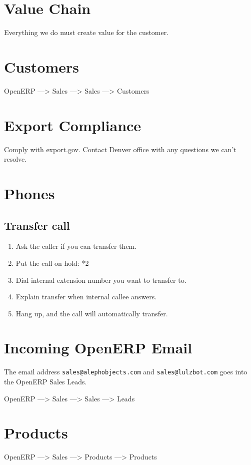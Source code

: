 \section{Value Chain}
Everything we do must create value for the customer.

\section{Customers}
OpenERP ---> Sales ---> Sales ---> Customers

\section{Export Compliance}
Comply with export.gov. Contact Denver office with any questions we can't
resolve.

\section{Phones}
\subsection{Transfer call}
\begin{enumerate}
\item Ask the caller if you can transfer them.
\item Put the call on hold: *2
\item Dial internal extension number you want to transfer to.
\item Explain transfer when internal callee answers.
\item Hang up, and the call will automatically transfer.
\end{enumerate}

\section{Incoming OpenERP Email}
The email address \texttt{sales@alephobjects.com} and
\texttt{sales@lulzbot.com} goes into the OpenERP Sales Leads.

OpenERP ---> Sales ---> Sales ---> Leads

\section{Products}

OpenERP ---> Sales ---> Products ---> Products

